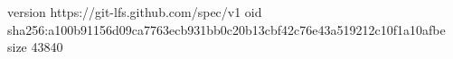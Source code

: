 version https://git-lfs.github.com/spec/v1
oid sha256:a100b91156d09ca7763ecb931bb0c20b13cbf42c76e43a519212c10f1a10afbe
size 43840
